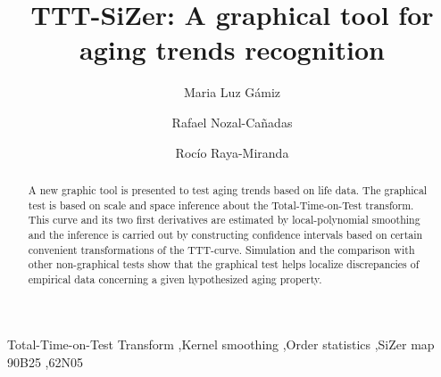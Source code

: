 \documentclass[preprint,12pt]{elsarticle}
\begin{document}
\begin{frontmatter}

\title{TTT-SiZer: A graphical tool for aging trends recognition }


%
%

\author[inst1]{Maria Luz G\'amiz}

\author[inst2]{Rafael Nozal-Ca\~nadas}

\author[inst1]{Roc\'io Raya-Miranda}



\address[inst1]{Department of Statistics and O.R., University of Granada,  Spain}
\address[inst2]{Department of Computer Science, University of Tromsø , Norway}


%
%


\begin{abstract}
A new graphic tool is presented to test aging trends based on life data.  The graphical test is based on scale and space inference about the Total-Time-on-Test transform. This curve and its two first derivatives are estimated by local-polynomial smoothing and the inference is carried out by constructing confidence intervals based on certain convenient transformations of the TTT-curve. Simulation and the comparison with other non-graphical tests show that the graphical test helps localize discrepancies of empirical data concerning a given hypothesized aging property. 

\end{abstract}

\begin{keyword}
Total-Time-on-Test Transform \sep Kernel smoothing \sep Order statistics \sep SiZer map
\MSC[2010] 90B25 \sep  62N05
\end{keyword}

\end{frontmatter}
\end{document}
